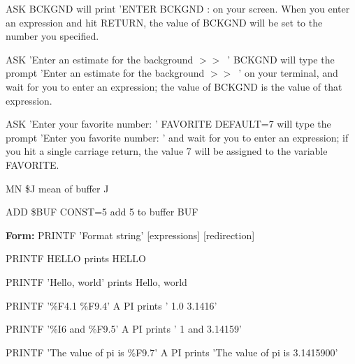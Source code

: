 {\newpage\clearpage
{}%
\begin{example}
  \item[ASK BCKGND\hfill]{will print 'ENTER BCKGND : on your screen.  When
       you enter an expression and hit RETURN, the value of BCKGND will be
       set to the number you specified.}
\par
\item[ASK 'Enter an estimate for the background $>>$\  ' BCKGND \hfill]
       {will type the prompt 'Enter an estimate for the background $>>$\  ' on
       your terminal, and wait for you to enter an expression; the value of
       BCKGND is the value of that expression.}
\par
\item[ASK 'Enter your favorite number: ' FAVORITE DEFAULT=7\hfill]
       { will type the prompt 'Enter you favorite number: ' and wait for
       you to enter an expression; if you hit a single carriage return, the
       value 7 will be assigned to the variable FAVORITE.}
\par
\end{example}%
\lthtmlfigureZ
\lthtmlcheckvsize\clearpage}

{\newpage\clearpage
{}%
\begin{example}
  \item[MN \$J\hfill]{mean of buffer J}
  \item[ADD \$BUF CONST=5\hfill]{add 5 to buffer BUF}
\end{example}%
\lthtmlfigureZ
\lthtmlcheckvsize\clearpage}

{\newpage\clearpage
{}%
\begin{command}
  \item[\textbf{Form: } PRINTF 'Format string' {[expressions]} {[redirection]}\hfill]{}
\end{command}%
\lthtmlfigureZ
\lthtmlcheckvsize\clearpage}

{\newpage\clearpage
{}%
\begin{example}
  \item[PRINTF HELLO\hfill]{prints HELLO}
  \item[PRINTF 'Hello, world'\hfill]{prints Hello, world}
\end{example}%
\lthtmlfigureZ
\lthtmlcheckvsize\clearpage}

{\newpage\clearpage
{}%
\begin{example}
  \item[PRINTF '\%F4.1 \%F9.4' A PI\hfill]{ prints ' 1.0    3.1416'}
  \item[PRINTF '\%I6 and \%F9.5' A PI\hfill]{ prints '     1 and   3.14159'}
  \item[PRINTF 'The value of pi is \%F9.7' A PI\hfill]{ prints 
'The value of pi is 3.1415900'}
\end{example}%
\lthtmlfigureZ
\lthtmlcheckvsize\clearpage}

